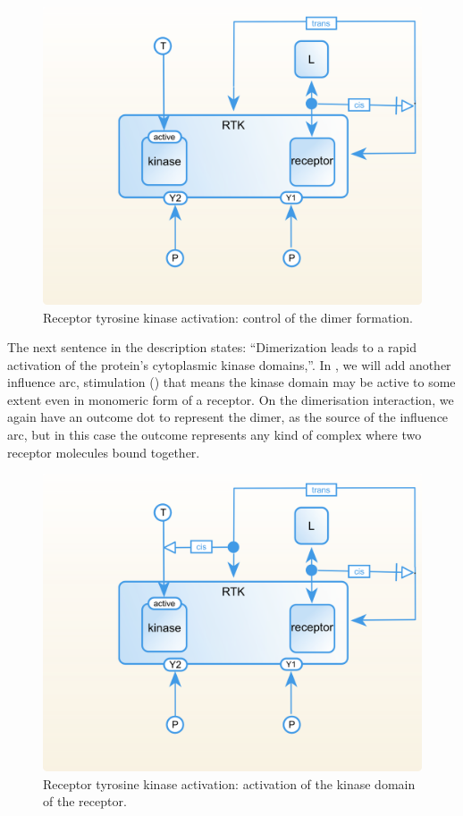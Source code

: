 \begin{figure}[H]
  \centering
  \vspace*{-0.75em}
  \includegraphics[scale=0.75]{examples/rtk-dimer-control.png}
   \caption{Receptor tyrosine kinase activation: control of the dimer formation.}
  \label{fig:rtk-dimer-control}
\end{figure}

The next sentence in the description states: ``Dimerization leads to a rapid activation of the protein's cytoplasmic kinase domains,''. In , we will add another influence arc, stimulation () that means the kinase domain may be active to some extent even in monomeric form of a receptor. On the dimerisation interaction, we again have an outcome dot to represent the dimer, as the source of the influence arc, but in this case the outcome represents any kind of complex where two receptor molecules bound together.

\begin{figure}[H]
  \centering
  \vspace*{-0.75em}
  \includegraphics[scale=0.75]{examples/rtk-kinase-activation.png}
   \caption{Receptor tyrosine kinase activation: activation of the kinase domain of the receptor.}
  \label{fig:rtk-kinase-activation}
\end{figure}

